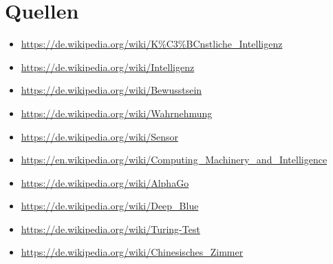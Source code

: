 \section{Quellen}
\begin{itemize}
\item \url{https://de.wikipedia.org/wiki/K%C3%BCnstliche_Intelligenz}
\item \url{https://de.wikipedia.org/wiki/Intelligenz}
\item \url{https://de.wikipedia.org/wiki/Bewusstsein}
\item \url{https://de.wikipedia.org/wiki/Wahrnehmung}
\item \url{https://de.wikipedia.org/wiki/Sensor}
\item \url{https://en.wikipedia.org/wiki/Computing_Machinery_and_Intelligence}
\item \url{https://de.wikipedia.org/wiki/AlphaGo}
\item \url{https://de.wikipedia.org/wiki/Deep_Blue}
\item \url{https://de.wikipedia.org/wiki/Turing-Test}
\item \url{https://de.wikipedia.org/wiki/Chinesisches_Zimmer}
\end{itemize}
